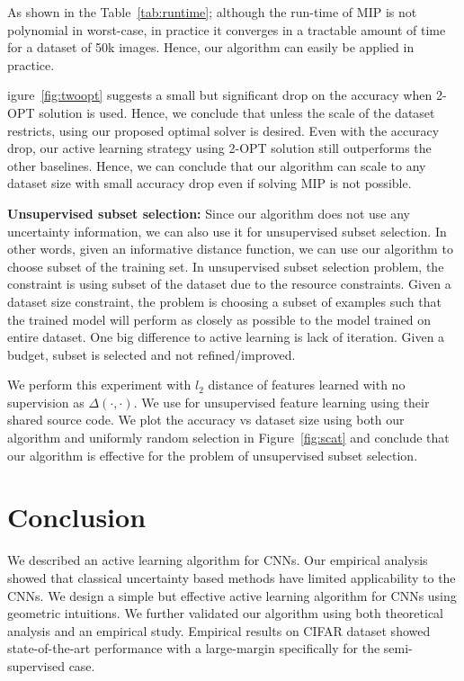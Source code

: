 \documentclass{article}
\begin{document}
As shown in the Table~\ref{tab:runtime}; although the run-time of MIP is not polynomial in worst-case, in practice it converges in a tractable amount of time for a dataset of 50k images. %
Hence, our algorithm can easily be applied in practice. %
 
 igure~\ref{fig:twoopt} suggests a small but significant drop on the accuracy when 2-OPT solution is used. Hence, we conclude that unless the scale of the dataset restricts, using our proposed optimal solver is desired. %
Even with the accuracy drop, our active learning strategy using 2-OPT solution still outperforms the other baselines. Hence, we can conclude that our algorithm can scale to any dataset size with small accuracy drop even if solving MIP is not possible.

\noindent\textbf{Unsupervised subset selection:} Since our algorithm does not use any uncertainty information, we can also use it for unsupervised subset selection. In other words, given an informative distance function, we can use our algorithm to choose subset of the training set. In unsupervised subset selection problem, the constraint is using subset of the dataset due to the resource constraints. Given a dataset size constraint, the problem is choosing a subset of examples such that the trained model will perform as closely as possible to the model trained on entire dataset. One big difference to active learning is lack of iteration. Given a budget, subset is selected and not refined/improved.


We perform this experiment with $l_2$ distance of features learned with no supervision as $\Delta(\cdot,\cdot)$. We use \cite{improved_gan} for unsupervised feature learning using their shared source code. We plot the accuracy vs dataset size using both our algorithm and uniformly random selection in Figure~\ref{fig:scat} and conclude that our algorithm is effective for the problem of unsupervised subset selection.  


\section{Conclusion}
We described an active learning algorithm for CNNs. Our empirical analysis showed that classical uncertainty based methods have limited applicability to the CNNs. We design a simple but effective active learning algorithm for CNNs using geometric intuitions. We further validated our algorithm using both theoretical analysis and an empirical study. Empirical results on CIFAR\cite{cifar} dataset showed state-of-the-art performance with a large-margin specifically for the semi-supervised case.


 

\end{document}
